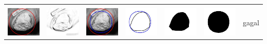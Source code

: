 \begin{table}[H]
\begin{tabular}{|m{0.7in}|m{0.7in}|m{0.7in}|m{0.7in}|m{0.7in}|m{0.7in}|m{0.7in}|}
		&  &  & & & &  \\
		\includegraphics[width=0.7in]{dataset/dataset_3/luka_kuning/ready/35_integer_init.jpg}&
		\includegraphics[width=0.7in]{dataset/dataset_3/luka_kuning/ready/35_integer_ext.jpg}&
		\includegraphics[width=0.7in]{dataset/dataset_3/luka_kuning/ready/35_integer_result.jpg}&
		\includegraphics[width=0.7in]{dataset/dataset_3/luka_kuning/ready/35_gt_r_integer.jpg}&
		\includegraphics[width=0.7in]{dataset/dataset_3/luka_kuning/ready/35_r.jpg}&
		\includegraphics[width=0.7in]{dataset/dataset_3/luka_kuning/ready/35_integer_r.jpg}&
		gagal\\
		\hline
		

\end{tabular}
\end{table}
